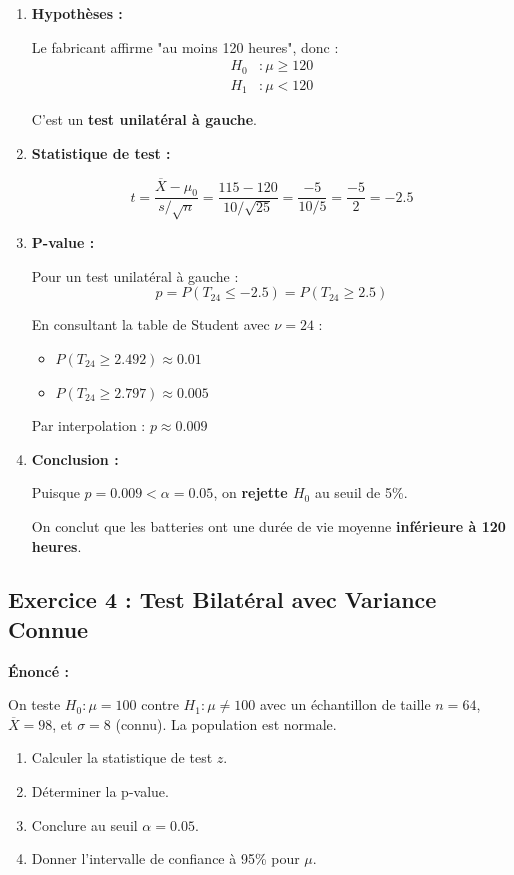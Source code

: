 \documentclass[11pt,a4paper]{article}
\begin{document}
\begin{enumerate}
    \item \textbf{Hypothèses :}
    
    Le fabricant affirme "au moins 120 heures", donc :
    \begin{align*}
        H_0 &: \mu \geq 120 \\
        H_1 &: \mu < 120
    \end{align*}
    
    C'est un \textbf{test unilatéral à gauche}.
    
    \item \textbf{Statistique de test :}
    
    $$t = \frac{\overline{X} - \mu_0}{s/\sqrt{n}} = \frac{115 - 120}{10/\sqrt{25}} = \frac{-5}{10/5} = \frac{-5}{2} = -2.5$$
    
    \item \textbf{P-value :}
    
    Pour un test unilatéral à gauche :
    $$p = P(T_{24} \leq -2.5) = P(T_{24} \geq 2.5)$$
    
    En consultant la table de Student avec $\nu = 24$ :
    \begin{itemize}
        \item $P(T_{24} \geq 2.492) \approx 0.01$
        \item $P(T_{24} \geq 2.797) \approx 0.005$
    \end{itemize}
    
    Par interpolation : $p \approx 0.009$
    
    \item \textbf{Conclusion :}
    
    Puisque $p = 0.009 < \alpha = 0.05$, on \textbf{rejette $H_0$} au seuil de 5\%.
    
    On conclut que les batteries ont une durée de vie moyenne \textbf{inférieure à 120 heures}.
\end{enumerate}

\subsection{Exercice 4 : Test Bilatéral avec Variance Connue}

\textbf{Énoncé :}

On teste $H_0 : \mu = 100$ contre $H_1 : \mu \neq 100$ avec un échantillon de taille $n = 64$, $\overline{X} = 98$, et $\sigma = 8$ (connu). La population est normale.

\begin{enumerate}
    \item Calculer la statistique de test $z$.
    \item Déterminer la p-value.
    \item Conclure au seuil $\alpha = 0.05$.
    \item Donner l'intervalle de confiance à 95\% pour $\mu$.
\end{enumerate}
\end{document}
